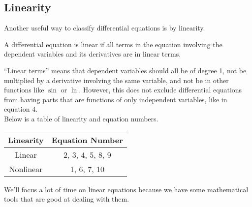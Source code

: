 \subsection{Linearity}
\noindent
Another useful way to classify differential equations is by linearity.
\begin{definition}
	A differential equation is linear if all terms in the equation involving the dependent variables and its derivatives are in linear terms.
\end{definition}
\noindent
``Linear terms'' means that dependent variables should all be of degree 1, not be multiplied by a derivative involving the same variable, and not be in other functions like $\sin$ or $\ln$.
However, this does not exclude differential equations from having parts that are functions of only independent variables, like in equation 4.\\

\noindent
Below is a table of linearity and equation numbers.
\begin{table}[H]
	\centering
	\begin{tabular}{c|c}
		Linearity & Equation Number \\
		\hline
		Linear &  2, 3, 4, 5, 8, 9 \\
		Nonlinear & 1, 6, 7, 10 \\
	\end{tabular}
\end{table}
\noindent
We'll focus a lot of time on linear equations because we have some mathematical tools that are good at dealing with them.